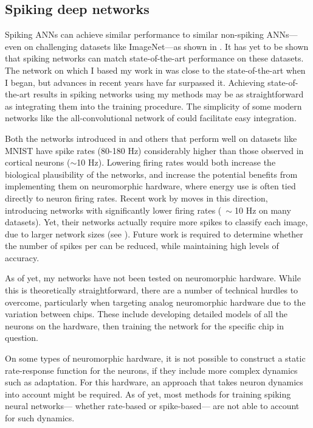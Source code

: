 \subsection{Spiking deep networks}

Spiking ANNs can achieve similar performance to similar non-spiking ANNs---%
even on challenging datasets like ImageNet---as shown in .
It has yet to be shown that spiking networks can match state-of-the-art
performance on these datasets.
The network on which I based my work in  \parencite{Krizhevsky2012}
was close to the state-of-the-art when I began,
but advances in recent years have far surpassed it.
Achieving state-of-the-art results in spiking networks using my methods
may be as straightforward as integrating them into the training procedure.
The simplicity of some modern networks
like the all-convolutional network of \textcite{Springenberg2015}
could facilitate easy integration.

Both the networks introduced in 
and others that perform well on datasets like MNIST \parencite[\eg/][]{Diehl2015}
have spike rates (80-180 Hz) considerably higher
than those observed in cortical neurons ($\sim$10 Hz).
Lowering firing rates would both increase the biological plausibility
of the networks,
and increase the potential benefits from implementing them on neuromorphic hardware,
where energy use is often tied directly to neuron firing rates.
Recent work by \textcite{Zambrano2017} moves in this direction,
introducing networks with significantly lower firing rates
($~\sim$10 Hz on many datasets).
Yet, their networks actually require more spikes to classify each image,
due to larger network sizes (see ).
Future work is required to determine
whether the number of spikes per can be reduced,
while maintaining high levels of accuracy.

As of yet, my networks have not been tested on neuromorphic hardware.
While this is theoretically straightforward,
there are a number of technical hurdles to overcome,
particularly when targeting analog neuromorphic hardware
due to the variation between chips.
These include developing detailed models of all the neurons on the hardware,
then training the network for the specific chip in question.

On some types of neuromorphic hardware,
it is not possible to construct a static rate-response function
for the neurons,
if they include more complex dynamics such as adaptation.
For this hardware, an approach that takes neuron dynamics into account
might be required.
As of yet, most methods for training spiking neural networks---%
whether rate-based or spike-based---%
are not able to account for such dynamics.



